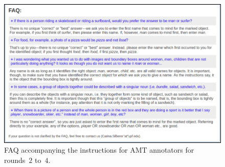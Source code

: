 \documentclass[11pt,a4paper]{article}
\begin{document}
\begin{figure}[htb]
  \centering
  \includegraphics[width=1.5\columnwidth]{figures/round1+_p2.png}
  \caption{FAQ accompanying the instructions for AMT annotators for rounds~$2$ to~$4$.}
  \label{fig:faq}
\end{figure}
\end{document}
